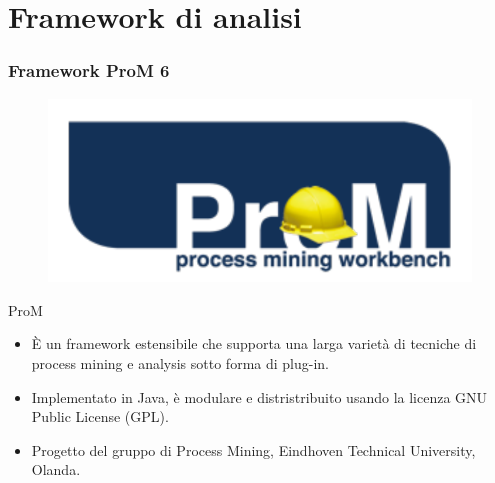 \documentclass[10pt]{beamer}
\begin{document}
%	
%
	\section{Framework di analisi}
	\begin{frame}
	\frametitle{Framework ProM 6}
	
	\begin{figure}
	\centering 
	\includegraphics[scale=0.50]{./fig/prom_subtitle_hat_300}
	\end{figure}
	  \begin{block}{ProM}
	    \begin{itemize}
	    \item \`{E} un framework estensibile  che supporta una larga variet\`{a} di tecniche di process mining e analysis sotto forma di plug-in.
	    \item Implementato in Java, \`{e} modulare e distristribuito usando la licenza GNU Public License (GPL).
	    \item Progetto del gruppo di Process Mining, Eindhoven Technical University, Olanda.
	    \end{itemize}
	    \end{block}
	    
	\end{frame}
	
\end{document}
